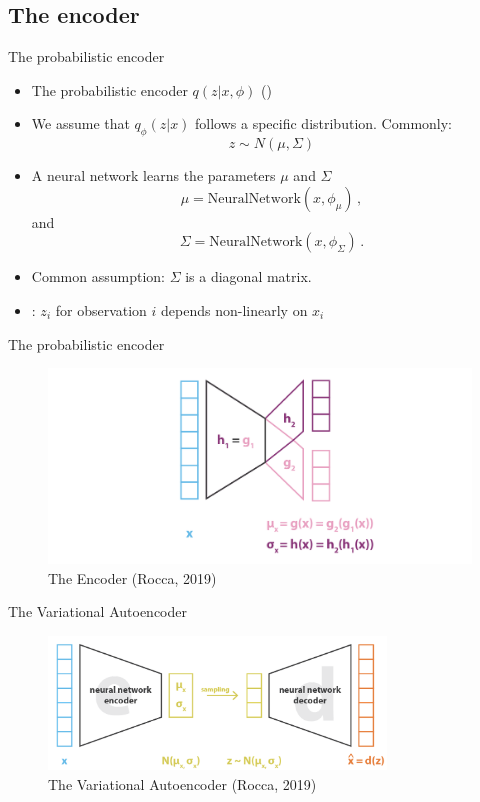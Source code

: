\documentclass[10pt]{beamer}
\begin{document}
\subsection{The encoder}

\begin{frame}{The probabilistic encoder}

\begin{itemize}
\item The probabilistic encoder $q(z|x, \phi)$ ()
\pause
\item We assume that $q_\phi(z|x)$ follows a specific distribution. Commonly:
\[
z \sim N(\mu, \Sigma)
\]
\pause
\item A neural network learns the parameters $\mu$ and $\Sigma$
\[
\mu = \text{NeuralNetwork}(x,\phi_\mu)\,,
\]
and
\[
\Sigma = \text{NeuralNetwork}(x,\phi_\Sigma)\,.
\]
\pause
\item Common assumption: $\Sigma$ is a diagonal matrix.
\pause
\item {}: $z_i$ for observation $i$ depends non-linearly on $x_i$
\end{itemize}

\end{frame}

\begin{frame}{The probabilistic encoder}

\begin{figure}[h]
\centering
\includegraphics[width=1\textwidth]{fig/Rocca_VAE_encoder.png}
\caption{The Encoder (Rocca, 2019)}
\end{figure}

\end{frame}



\begin{frame}{The Variational Autoencoder}

\begin{figure}[h]
\centering
\includegraphics[width=0.8\textwidth]{fig/Rocca_VAE2.png}
\caption{The Variational Autoencoder (Rocca, 2019)}
\end{figure}

\end{frame}
\end{document}
